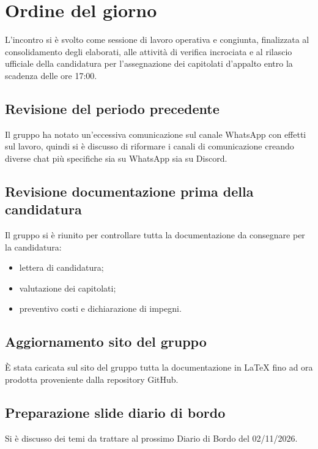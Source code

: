 \newpage
\vspace{0.8cm}

\section{Ordine del giorno}
L'incontro si è svolto come sessione di lavoro operativa e congiunta, finalizzata al consolidamento degli elaborati, alle attività di verifica incrociata e al rilascio ufficiale della candidatura per l'assegnazione dei capitolati d'appalto entro la scadenza delle ore 17:00.

\subsection{Revisione del periodo precedente}
Il gruppo ha notato un'eccessiva comunicazione sul canale WhatsApp con effetti sul lavoro, quindi si è discusso di riformare i canali di comunicazione creando diverse chat più specifiche sia su WhatsApp sia su Discord.

\subsection{Revisione documentazione prima della candidatura}
Il gruppo si è riunito per controllare tutta la documentazione da consegnare per la candidatura:
\begin{itemize}
    \item lettera di candidatura;
    \item valutazione dei capitolati;
    \item preventivo costi e dichiarazione di impegni.
\end{itemize}

\subsection{Aggiornamento sito del gruppo}
È stata caricata sul sito del gruppo tutta la documentazione in LaTeX fino ad ora prodotta proveniente dalla repository GitHub.

\subsection{Preparazione slide diario di bordo}
Si è discusso dei temi da trattare al prossimo Diario di Bordo del 02/11/2026.

